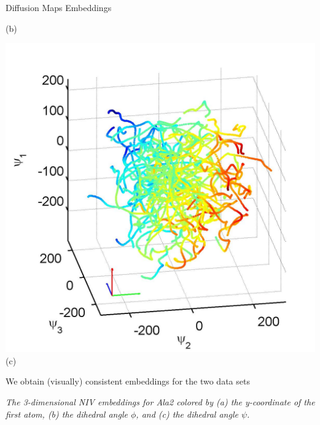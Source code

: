 \documentclass[12pt]{beamer}
\begin{document}
\begin{frame}{Diffusion Maps Embeddings}
{\begin{minipage}{0.2\textwidth}
        (b)
    \end{minipage}
    \begin{minipage}{0.2\textwidth}
        \centering
        \includegraphics[width=\textwidth]{ala2_embed3}\\
        (c)
    \end{minipage}}
    
    \vspace{0.1in}
        {\small We obtain (visually) consistent embeddings for the two data sets }

    {\em \scriptsize The 3-dimensional NIV embeddings for Ala2 colored by (a) the y-coordinate of the first atom, (b) the dihedral angle $\phi$, and (c) the dihedral angle $\psi$. \par}

\end{frame}
\end{document}
